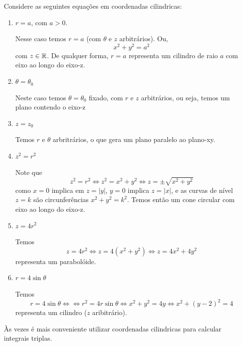 \begin{example}
    Considere as seguintes equações em coordenadas cilindricas:
        \begin{enumerate}
            \item \(r = a\), com \(a > 0\).
                
                Nesse caso temos \(r=a\) (com \(\theta\) e \(z\) arbitrários). Ou, \[x^2 + y^2 = a^2\] com \(z\in\mathbb{R}\). De qualquer forma, \(r=a\) representa um cilindro de raio \(a\) com eixo ao longo do eixo-z. %

            \item \(\theta = \theta_0\)
            
                Neste caso temos \(\theta = \theta_0\) fixado, com \(r\) e \(z\) arbitrários, ou seja, temos um plano contendo o eixo-z %

            \item \(z = z_0\)
            
                Temos \(r\) e \(\theta\) arbritrários, o que gera um plano paralelo ao plano-xy.

            \item \(z^2 = r^2\)
            
                Note que \[z^2 = r^2 \Leftrightarrow z^2 = x^2 + y^2 \Leftrightarrow z = \pm\sqrt{x^2 + y^2}\] como \(x=0\) implica em \(z = |y|\), \(y=0\) implica \(z=|x|\), e as curvas de nível \(z = k\) são circunferências \(x^2 + y^2 = k^2\). Temos então um cone circular com eixo ao longo do eixo-z.

            \item \(z = 4r^2\)
            
                Temos \[z = 4r^2 \Leftrightarrow z = 4(x^2 + y^2) \Leftrightarrow z = 4x^2 + 4y^2\] representa um parabolóide.

            \item \(r = 4\sin\theta\)
            
                Temos \[r = 4\sin\theta \Leftrightarrow \Leftrightarrow r^2 = 4r\sin\theta \Leftrightarrow x^2 + y^2 = 4y \Leftrightarrow x^2 + (y-2)^2 = 4\] representa um cilindro (\(z\) aribitrário).
        \end{enumerate}
\end{example}

Às vezes é mais conveniente utilizar coordenadas cilindricas para calcular integrais triplas.

